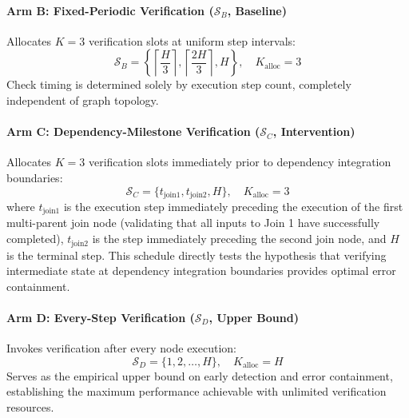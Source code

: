 \paragraph{Arm B: Fixed-Periodic Verification ($\mathcal{S}_B$, Baseline)}
Allocates $K = 3$ verification slots at uniform step intervals:
\begin{equation}
    \mathcal{S}_B = \left\{ \left\lceil \frac{H}{3} \right\rceil, \left\lceil \frac{2H}{3} \right\rceil, H \right\}, \quad K_{\text{alloc}} = 3
\end{equation}
Check timing is determined solely by execution step count, completely independent of graph topology.

\paragraph{Arm C: Dependency-Milestone Verification ($\mathcal{S}_C$, Intervention)}
Allocates $K = 3$ verification slots immediately prior to dependency integration boundaries:
\begin{equation}
    \mathcal{S}_C = \{t_{\text{join1}}, t_{\text{join2}}, H\}, \quad K_{\text{alloc}} = 3
\end{equation}
where $t_{\text{join1}}$ is the execution step immediately preceding the execution of the first multi-parent join node (validating that all inputs to Join 1 have successfully completed), $t_{\text{join2}}$ is the step immediately preceding the second join node, and $H$ is the terminal step. This schedule directly tests the hypothesis that verifying intermediate state at dependency integration boundaries provides optimal error containment.

\paragraph{Arm D: Every-Step Verification ($\mathcal{S}_D$, Upper Bound)}
Invokes verification after every node execution:
\begin{equation}
    \mathcal{S}_D = \{1, 2, \dots, H\}, \quad K_{\text{alloc}} = H
\end{equation}
Serves as the empirical upper bound on early detection and error containment, establishing the maximum performance achievable with unlimited verification resources.

